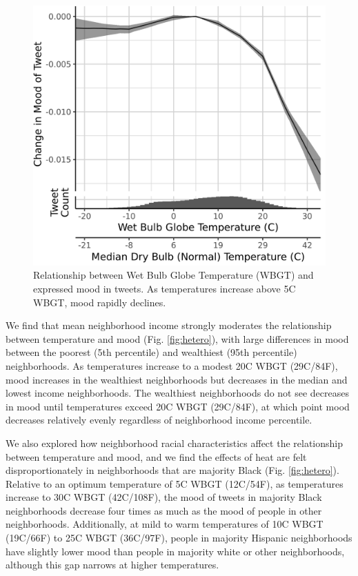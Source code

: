 \documentclass[fleqn,10pt]{wlscirep}
\begin{document}
\begin{figure}[H]
 \centering
 \includegraphics[width=0.5\linewidth]{../res/wbgt.png}
 \caption{Relationship between Wet Bulb Globe Temperature (WBGT) and expressed mood in tweets. As temperatures increase above 5\textdegree C WBGT, mood rapidly declines.}
 \label{fig:wbgt}
\end{figure}

We find that mean neighborhood income strongly moderates the relationship between temperature and mood (Fig. \ref{fig:hetero}), with large differences in mood between the poorest (5th percentile) and wealthiest (95th percentile) neighborhoods. As temperatures increase to a modest 20\textdegree C WBGT (29\textdegree C/84\textdegree F), mood increases in the wealthiest neighborhoods but decreases in the median and lowest income neighborhoods. The wealthiest neighborhoods do not see decreases in mood until temperatures exceed 20\textdegree C WBGT (29\textdegree C/84\textdegree F), at which point mood decreases relatively evenly regardless of neighborhood income percentile.

We also explored how neighborhood racial characteristics affect the relationship between temperature and mood, and we find the effects of heat are felt disproportionately in neighborhoods that are majority Black (Fig. \ref{fig:hetero}). Relative to an optimum temperature of 5\textdegree C WBGT (12\textdegree C/54\textdegree F), as temperatures increase to 30\textdegree C WBGT (42\textdegree C/108\textdegree F), the mood of tweets in majority Black neighborhoods decrease four times as much as the mood of people in other neighborhoods. Additionally, at mild to warm temperatures of 10\textdegree C WBGT (19\textdegree C/66\textdegree F) to 25\textdegree C WBGT (36\textdegree C/97\textdegree F), people in majority Hispanic neighborhoods have slightly lower mood than people in majority white or other neighborhoods, although this gap narrows at higher temperatures.
\end{document}
